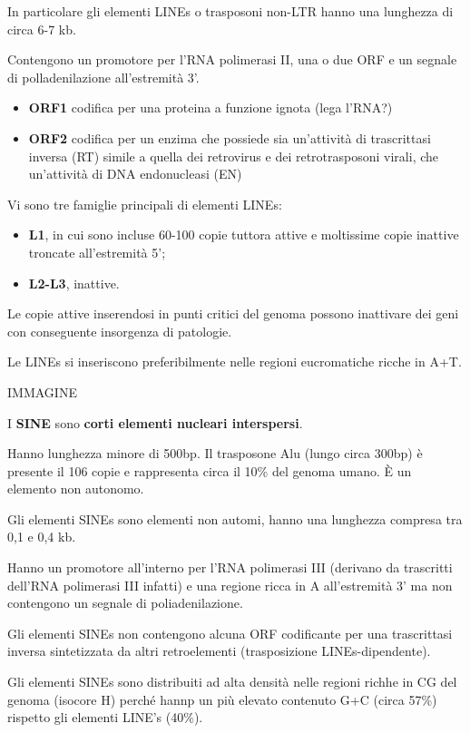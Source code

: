 \documentclass[11pt]{book}
\begin{document}
In particolare gli elementi LINEs o trasposoni non-LTR hanno una
lunghezza di circa 6-7 kb.

Contengono un promotore per l'RNA polimerasi II, una o due ORF e un
segnale di polladenilazione all'estremità 3'.

\begin{itemize}
\itemsep1pt\parskip0pt
\item
  \textbf{ORF1} codifica per una proteina a funzione ignota (lega
  l'RNA?)
\item
  \textbf{ORF2} codifica per un enzima che possiede sia un'attività di
  trascrittasi inversa (RT) simile a quella dei retrovirus e dei
  retrotrasposoni virali, che un'attività di DNA endonucleasi (EN)
\end{itemize}

Vi sono tre famiglie principali di elementi LINEs:

\begin{itemize}
\itemsep1pt\parskip0pt
\item
  \textbf{L1}, in cui sono incluse 60-100 copie tuttora attive e
  moltissime copie inattive troncate all'estremità 5';
\item
  \textbf{L2-L3}, inattive.
\end{itemize}

Le copie attive inserendosi in punti critici del genoma possono
inattivare dei geni con conseguente insorgenza di patologie.

Le LINEs si inseriscono preferibilmente nelle regioni eucromatiche
ricche in A+T.

IMMAGINE

I \textbf{SINE} sono \textbf{corti elementi nucleari interspersi}.

Hanno lunghezza minore di 500bp. Il trasposone Alu (lungo circa 300bp) è
presente il 106 copie e rappresenta circa il 10\% del genoma umano. È un
elemento non autonomo.

Gli elementi SINEs sono elementi non automi, hanno una lunghezza
compresa tra 0,1 e 0,4 kb.

Hanno un promotore all'interno per l'RNA polimerasi III (derivano da
trascritti dell'RNA polimerasi III infatti) e una regione ricca in A
all'estremità 3' ma non contengono un segnale di poliadenilazione.

Gli elementi SINEs non contengono alcuna ORF codificante per una
trascrittasi inversa sintetizzata da altri retroelementi (trasposizione
LINEs-dipendente).

Gli elementi SINEs sono distribuiti ad alta densità nelle regioni richhe
in CG del genoma (isocore H) perché hannp un più elevato contenuto G+C
(circa 57\%) rispetto gli elementi LINE's (40\%).
\end{document}
